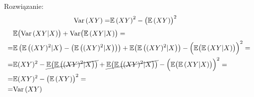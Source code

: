 Rozwiązanie:
\begin{align*}
\text{Var}\left(XY\right)=&\mathbb E \left(XY\right)^2-\bigl(\mathbb E \left(XY\right)\bigr)^2
\end{align*}
\begin{align*}
&\mathbb E \bigl(\text{Var}\left(XY|X\right)\bigr)+\text{Var}\bigl(\mathbb E \left(XY|X\right)\bigr)
=\\=&
\mathbb E \left(\mathbb E \left((XY)^2|X\right)-\bigl(\mathbb E \left((XY)^2|X\right)\bigr)\right)
+
\mathbb E \bigl(\mathbb E \left((XY)^2|X\right)\bigr)-\Bigl(\mathbb E \bigl(\mathbb E \left(XY|X\right)\bigr)\Bigr)^2
=\\=&
\mathbb E (XY)^2-\cancel{\mathbb E \bigl(\mathbb E \left((XY)^2|X\right)\bigr)}
+
\cancel{\mathbb E \bigl(\mathbb E \left((XY)^2|X\right)\bigr)}-\Bigl(\mathbb E \bigl(\mathbb E \left(XY|X\right)\bigr)\Bigr)^2
=\\=&
\mathbb E (XY)^2-\bigl(\mathbb E \left(XY\right)\bigr)^2
=\\=&
\text{Var}\left(XY\right)
\end{align*}